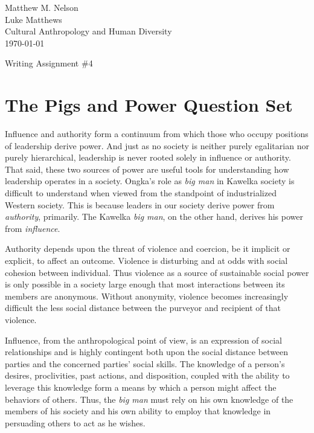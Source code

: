 \documentclass[12pt]{article}
\begin{document}
\begin{flushright}
\singlespacing
Matthew M. Nelson\\
Luke Matthews\\
Cultural Anthropology and Human Diversity\\
\today\\
\end{flushright}
\doublespacing

\begin{center}
  Writing Assignment \#4
\end{center}

\section*{The Pigs and Power Question Set}

Influence and authority form a continuum from which those who occupy positions
of leadership derive power. And just as no society is neither purely egalitarian
nor purely hierarchical, leadership is never rooted solely in influence or
authority. That said, these two sources of power are useful tools for
understanding how leadership operates in a society. Ongka's role as \emph{big man} in
Kawelka society is difficult to understand when viewed from the standpoint of
industrialized Western society. This is because leaders in our society derive
power from \emph{authority}, primarily. The Kawelka \emph{big man}, on the other hand, derives
his power from \emph{influence}.

Authority depends upon the threat of violence and coercion, be it implicit or
explicit, to affect an outcome. Violence is disturbing and at odds with social
cohesion between individual. Thus violence as a source of sustainable social
power is only possible in a society large enough that most interactions between
its members are anonymous. Without anonymity, violence becomes increasingly
difficult the less social distance between the purveyor and recipient of that
violence.

Influence, from the anthropological point of view, is an expression of social
relationships and is highly contingent both upon the social distance between
parties and the concerned parties' social skills. The knowledge of a person's
desires, proclivities, past actions, and disposition, coupled with the ability
to leverage this knowledge form a means by which a person might affect the
behaviors of others. Thus, the \emph{big man} must rely on his own knowledge of the
members of his society and his own ability to employ that knowledge in
persuading others to act as he wishes.
\end{document}
